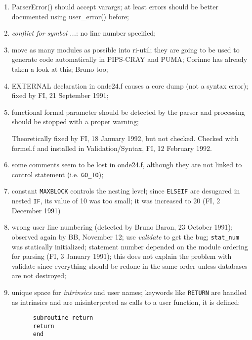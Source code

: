 \begin{enumerate}
  \item ParserError() should accept varargs; at least errors should be better
        documented using user\_error() before;

  \item {\em conflict for symbol ...}: no line number specified;

  \item move as many modules as possible into ri-util; they are going to
        be used to generate code automatically in PIPS-CRAY and PUMA;
        Corinne has already taken a look at this; Bruno too;

  \item EXTERNAL declaration in onde24.f causes a core dump (not a syntax
        error); fixed by FI, 21 September 1991;

  \item functional formal parameter should be detected by the parser and
        processing should be stopped with a proper warning;

        Theoretically fixed by FI, 18 January 1992, but not checked.
        Checked with formel.f and installed in Validation/Syntax,
        FI, 12 February 1992.

  \item some comments seem to be lost in onde24.f, although they are
        not linked to control statement (i.e. \verb+GO_TO+);

  \item constant \verb+MAXBLOCK+ controls the nesting level; since
        \verb+ELSEIF+ are desugared in nested \verb+IF+, its value of
        10 was too small; it was increased to 20 (FI, 2 December 1991)

  \item wrong user line numbering (detected by Bruno Baron, 23 October 1991);
        observed again by BB, November 12; use {\em validate} to get
        the bug; \verb+stat_num+ was statically initialized; statement
        number depended on the module ordering for parsing (FI, 3
        January 1991); this does not explain the problem with validate
        since everything should be redone in the same order unless
        databases are not destroyed;

  \item unique space for {\em intrinsics} and user names; keywords like
        \verb+RETURN+ are handled as intrinsics and are misinterpreted
        as calls to a user function, it is defined:

\begin{verbatim}
      subroutine return
      return
      end
\end{verbatim}


\end{enumerate}
